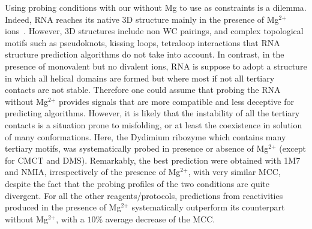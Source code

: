 \documentclass[a4,center,fleqn]{NAR}
\begin{document}
Using probing conditions with our without Mg to use as constraints is a dilemma. Indeed, RNA reaches its native 3D structure mainly in the presence of Mg$^{\text{2+}}$ ions~\cite{ccc}. However, 3D structures include non WC pairings, and complex topological motifs such as pseudoknots, kissing loops, tetraloop interactions that RNA structure prediction algorithms do not take into account. In contrast, in the presence of monovalent but no divalent ions, RNA is suppose to adopt a structure in which all helical domains are formed but where most if not all tertiary contacts are not stable. Therefore one could assume that probing the RNA without Mg$^{\text{2+}}$ provides signals that are more compatible and less deceptive for predicting algorithms. However, it is likely that the instability of all the tertiary contacts is a situation prone to misfolding, or at least the coexistence in solution of many conformations. Here, the Dydimium ribozyme which contains many tertiary motifs, was systematically probed in presence or absence of Mg$^{\text{2+}}$ (except for CMCT and DMS). Remarkably, the best prediction were obtained with 1M7 and NMIA, irrespectively of the presence of Mg$^{\text{2+}}$, with very similar MCC, despite the fact that the probing profiles of the two conditions are quite divergent. For all the other reagents/protocols, predictions from reactivities produced in the presence of Mg$^{\text{2+}}$ systematically outperform its counterpart without Mg$^{\text{2+}}$, with a $10\%$ average decrease of the MCC.
\end{document}
